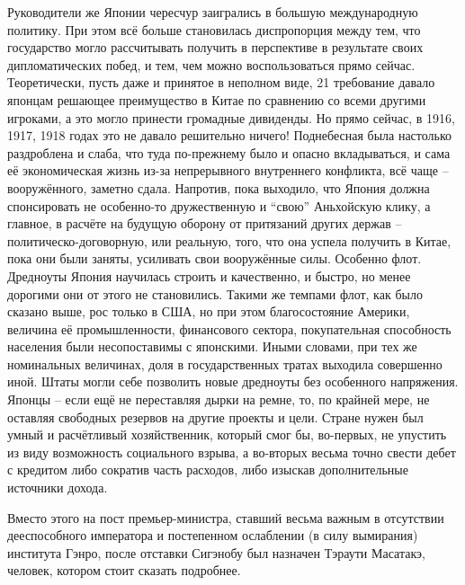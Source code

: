 Руководители же Японии чересчур заигрались в большую международную политику. При этом всё больше становилась диспропорция между тем, что государство могло рассчитывать получить в перспективе в результате своих дипломатических побед, и тем, чем можно воспользоваться прямо сейчас. Теоретически, пусть даже и принятое в неполном виде, 21 требование давало японцам решающее преимущество в Китае по сравнению со всеми другими игроками, а это могло принести громадные дивиденды. Но прямо сейчас, в 1916, 1917, 1918 годах это не давало решительно ничего! Поднебесная была настолько раздроблена и слаба, что туда по-прежнему было и опасно вкладываться, и сама её экономическая жизнь из-за непрерывного внутреннего конфликта, всё чаще – вооружённого, заметно сдала. Напротив, пока выходило, что Япония должна спонсировать не особенно-то дружественную и “свою” Аньхойскую клику, а главное, в расчёте на будущую оборону от притязаний других держав – политическо-договорную, или реальную, того, что она успела получить в Китае, пока они были заняты, усиливать свои вооружённые силы. Особенно флот. Дредноуты Япония научилась строить и качественно, и быстро, но менее дорогими они от этого не становились. Такими же темпами флот, как было сказано выше, рос только в США, но при этом благосостояние Америки, величина её промышленности, финансового сектора, покупательная способность населения были несопоставимы с японскими. Иными словами, при тех же номинальных величинах, доля в государственных тратах выходила совершенно иной. Штаты могли себе позволить новые дредноуты без особенного напряжения. Японцы – если ещё не переставляя дырки на ремне, то, по крайней мере, не оставляя свободных резервов на другие проекты и цели. Стране нужен был умный и расчётливый хозяйственник, который смог бы, во-первых, не упустить из виду возможность социального взрыва, а во-вторых весьма точно свести дебет с кредитом либо сократив часть расходов, либо изыскав дополнительные источники дохода.

Вместо этого на пост премьер-министра, ставший весьма важным в отсутствии дееспособного императора и постепенном ослаблении (в силу вымирания) института Гэнро, после отставки Сигэнобу был назначен Тэраути Масатакэ, человек, котором стоит сказать подробнее. 

